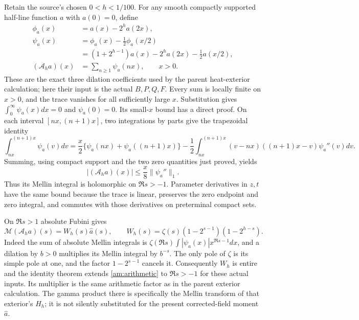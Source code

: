 Retain the source's chosen $0<h<1/100$. For any smooth compactly
supported half-line function $a$ with $a(0)=0$, define
\begin{align*}
 \phi_a(x)&=a(x)-2^h a(2x),\\
 \psi_a(x)&=\phi_a(x)-\tfrac12\phi_a(x/2)\\
  &=(1+2^{h-1})a(x)-2^ha(2x)-\tfrac12a(x/2),\\
 (\mathcal A_h a)(x)&=\sum_{n\geq1}\psi_a(nx),\qquad x>0.
\end{align*}
These are the exact three dilation coefficients used by the parent
heat-exterior calculation; here their input is the actual $B,P,Q,F$.
Every sum is locally finite on $x>0$, and the trace vanishes for all
sufficiently large $x$. Substitution gives
$\int_0^\infty\psi_a(x)dx=0$ and $\psi_a(0)=0$.
Its small-$x$ bound has a direct proof. On each interval $[nx,(n+1)x]$,
two integrations by parts give the trapezoidal identity
\[
 \int_{nx}^{(n+1)x}\psi_a(v)dv
 =\frac{x}{2}\{\psi_a(nx)+\psi_a((n+1)x)\}
 -\frac12\int_{nx}^{(n+1)x}
             (v-nx)((n+1)x-v)\psi_a''(v)dv.
\]
Summing, using compact support and the two zero quantities just
proved, yields
\begin{equation}
 |(\mathcal A_h a)(x)|\leq\frac{x}{8}\|\psi_a''\|_1.
 \label{am:tracebound}
\end{equation}
Thus its Mellin integral is holomorphic on $\Re s>-1$.
Parameter derivatives in $z,t$ have the same bound because the trace
is linear, preserves the zero endpoint and zero integral, and commutes
with those derivatives on preterminal compact sets.

On $\Re s>1$ absolute Fubini gives
\begin{equation}
 \mathcal M(\mathcal A_h a)(s)
    =W_h(s)\widehat a(s),\qquad
 W_h(s)=\zeta(s)(1-2^{s-1})(1-2^{h-s}).
 \label{am:arithmetic}
\end{equation}
Indeed the sum of absolute Mellin integrals is
$\zeta(\Re s)\int|\psi_a(x)|x^{\Re s-1}dx$, and a dilation by
$b>0$ multiplies its Mellin integral by $b^{-s}$.
The only pole of $\zeta$ is its simple pole at one, and the factor
$1-2^{s-1}$ cancels it. Consequently $W_h$ is entire and the identity
theorem extends \eqref{am:arithmetic} to $\Re s>-1$ for these
actual inputs. Its multiplier is the same arithmetic factor as in the
parent exterior calculation. The gamma product there is specifically
the Mellin transform of that exterior's $H_h$; it is not silently
substituted for the present corrected-field moment $\widehat a$.

